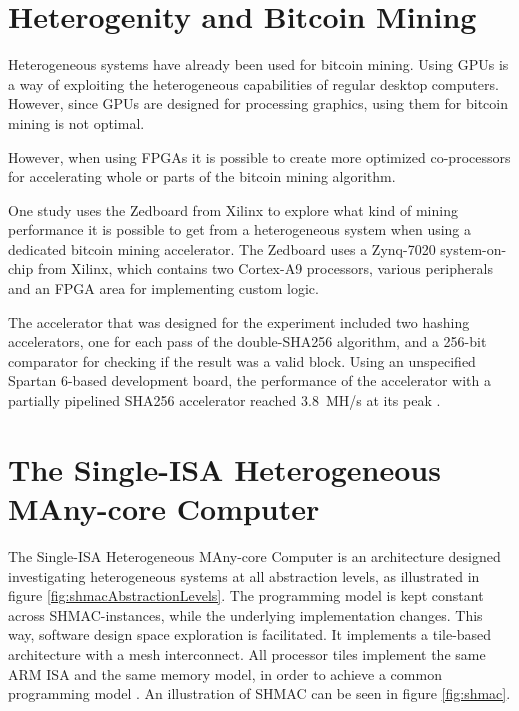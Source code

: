 \section{Heterogenity and Bitcoin Mining}

Heterogeneous systems have already been used for bitcoin mining. Using GPUs is a way of exploiting
the heterogeneous capabilities of regular desktop computers. However, since GPUs are designed for
processing graphics, using them for bitcoin mining is not optimal.

However, when using FPGAs it is possible to create more optimized co-processors for accelerating
whole or parts of the bitcoin mining algorithm.

One study uses the Zedboard from Xilinx to explore what kind of mining performance it is possible to
get from a heterogeneous system when using a dedicated bitcoin mining accelerator. The Zedboard
uses a Zynq-7020 system-on-chip from Xilinx, which contains two Cortex-A9 processors, various
peripherals and an FPGA area for implementing custom logic.

The accelerator that was designed for the experiment included two hashing accelerators, one
for each pass of the double-SHA256 algorithm, and a 256-bit comparator for checking if the
result was a valid block. Using an unspecified Spartan 6-based development board, the
performance of the accelerator with a partially pipelined SHA256 accelerator reached
3.8~MH/s at its peak \cite{xcell-bitcoin}.


\section{The Single-ISA Heterogeneous MAny-core Computer}
\label{sec:shmac}
The Single-ISA Heterogeneous MAny-core Computer is an architecture designed investigating heterogeneous
systems at all abstraction levels, as illustrated in figure \ref{fig:shmacAbstractionLevels}.
The programming model is kept constant across SHMAC-instances, while the underlying implementation changes.
This way, software design space exploration is facilitated.
It implements a tile-based architecture with a mesh interconnect. All processor tiles implement the same
ARM ISA and the same memory model, in order to achieve a common programming model \cite{shmac-plan}.
An illustration of SHMAC can be seen in figure \ref{fig:shmac}.

